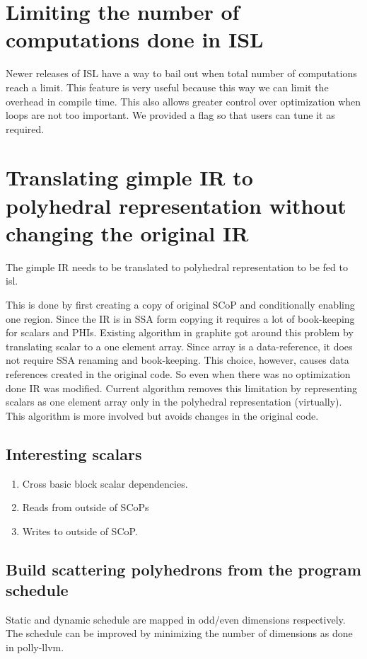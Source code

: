 \section{Limiting the number of computations done in ISL}
Newer releases of ISL have a way to bail out when total number of computations reach a limit.
This feature is very useful because this way we can limit the overhead in compile time. This also
allows greater control over optimization when loops are not too important. We provided a flag so
that users can tune it as required.


\section{Translating gimple IR to polyhedral representation without changing the original IR}
The gimple IR needs to be translated to polyhedral representation to be fed to isl.

This is done by first creating a copy of original SCoP and conditionally enabling one region.
Since the IR is in SSA form copying it requires a lot of book-keeping for scalars and PHIs.
Existing algorithm in graphite got around this problem by translating scalar to a one element array.
Since array is a data-reference, it does not require SSA renaming and book-keeping. This choice,
however, causes data references created in the original code. So even when there was no optimization done
IR was modified. Current algorithm removes this limitation by representing scalars as one element array only in the
polyhedral representation (virtually). This algorithm is more involved but avoids changes in the original code.

\subsection{Interesting scalars}
\begin{enumerate}
        \item Cross basic block scalar dependencies.
        \item Reads from outside of SCoPs
        \item Writes to outside of SCoP.
\end{enumerate}

\subsection{Build scattering polyhedrons from the program schedule}
Static and dynamic schedule are mapped in odd/even dimensions respectively.
The schedule can be improved by minimizing the number of dimensions as done in polly-llvm.

